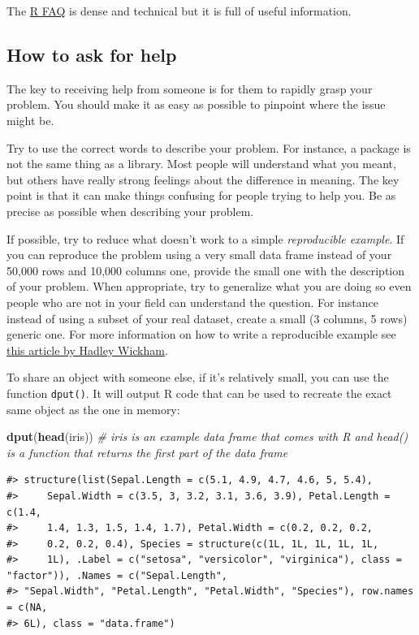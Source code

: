 \documentclass[]{book}
\newenvironment{Shaded}{\begin{snugshade}}{\end{snugshade}}
\newcommand{\KeywordTok}[1]{\textcolor[rgb]{0.13,0.29,0.53}{\textbf{#1}}}
\newcommand{\CommentTok}[1]{\textcolor[rgb]{0.56,0.35,0.01}{\textit{#1}}}
\newcommand{\NormalTok}[1]{#1}
\theoremstyle{definition}
\theoremstyle{definition}
\theoremstyle{remark}
\begin{document}
The \href{http://cran.r-project.org/doc/FAQ/R-FAQ.html}{R FAQ} is dense
and technical but it is full of useful information.

\subsection{How to ask for help}\label{how-to-ask-for-help}

The key to receiving help from someone is for them to rapidly grasp your
problem. You should make it as easy as possible to pinpoint where the
issue might be.

Try to use the correct words to describe your problem. For instance, a
package is not the same thing as a library. Most people will understand
what you meant, but others have really strong feelings about the
difference in meaning. The key point is that it can make things
confusing for people trying to help you. Be as precise as possible when
describing your problem.

If possible, try to reduce what doesn't work to a simple
\emph{reproducible example}. If you can reproduce the problem using a
very small data frame instead of your 50,000 rows and 10,000 columns
one, provide the small one with the description of your problem. When
appropriate, try to generalize what you are doing so even people who are
not in your field can understand the question. For instance instead of
using a subset of your real dataset, create a small (3 columns, 5 rows)
generic one. For more information on how to write a reproducible example
see \href{http://adv-r.had.co.nz/Reproducibility.html}{this article by
Hadley Wickham}.

To share an object with someone else, if it's relatively small, you can
use the function \texttt{dput()}. It will output R code that can be used
to recreate the exact same object as the one in memory:

\begin{Shaded}
\begin{Highlighting}[]
\KeywordTok{dput}\NormalTok{(}\KeywordTok{head}\NormalTok{(iris)) }\CommentTok{# iris is an example data frame that comes with R and head() is a function that returns the first part of the data frame}
\end{Highlighting}
\end{Shaded}

\begin{verbatim}
#> structure(list(Sepal.Length = c(5.1, 4.9, 4.7, 4.6, 5, 5.4), 
#>     Sepal.Width = c(3.5, 3, 3.2, 3.1, 3.6, 3.9), Petal.Length = c(1.4, 
#>     1.4, 1.3, 1.5, 1.4, 1.7), Petal.Width = c(0.2, 0.2, 0.2, 
#>     0.2, 0.2, 0.4), Species = structure(c(1L, 1L, 1L, 1L, 1L, 
#>     1L), .Label = c("setosa", "versicolor", "virginica"), class = "factor")), .Names = c("Sepal.Length", 
#> "Sepal.Width", "Petal.Length", "Petal.Width", "Species"), row.names = c(NA, 
#> 6L), class = "data.frame")
\end{verbatim}
\end{document}
